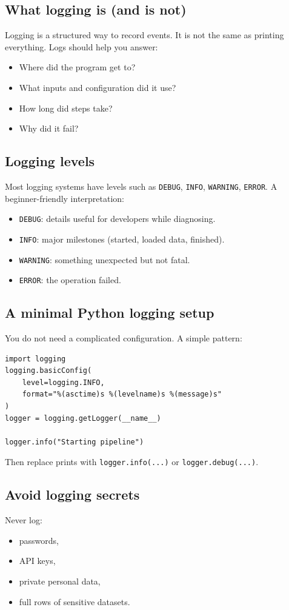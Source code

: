 \subsection{What logging is (and is not)}
Logging is a structured way to record events. It is not the same as printing everything. Logs should help you answer:
\begin{itemize}[noitemsep]
  \item Where did the program get to?
  \item What inputs and configuration did it use?
  \item How long did steps take?
  \item Why did it fail?
\end{itemize}

\subsection{Logging levels}
Most logging systems have levels such as \texttt{DEBUG}, \texttt{INFO}, \texttt{WARNING}, \texttt{ERROR}. A beginner-friendly interpretation:
\begin{itemize}[noitemsep]
  \item \texttt{DEBUG}: details useful for developers while diagnosing.
  \item \texttt{INFO}: major milestones (started, loaded data, finished).
  \item \texttt{WARNING}: something unexpected but not fatal.
  \item \texttt{ERROR}: the operation failed.
\end{itemize}

\subsection{A minimal Python logging setup}
You do not need a complicated configuration. A simple pattern:
\begin{verbatim}
import logging
logging.basicConfig(
    level=logging.INFO,
    format="%(asctime)s %(levelname)s %(message)s"
)
logger = logging.getLogger(__name__)

logger.info("Starting pipeline")
\end{verbatim}

Then replace prints with \texttt{logger.info(...)} or \texttt{logger.debug(...)}.

\subsection{Avoid logging secrets}
Never log:
\begin{itemize}[noitemsep]
  \item passwords,
  \item API keys,
  \item private personal data,
  \item full rows of sensitive datasets.
\end{itemize}

